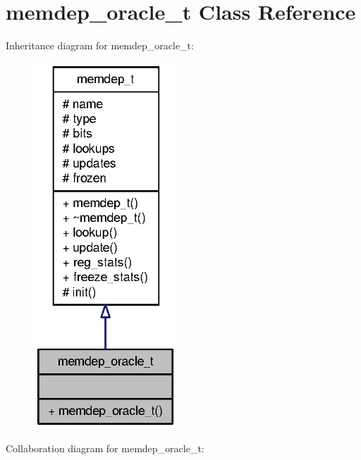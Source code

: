 \section{memdep\_\-oracle\_\-t Class Reference}
\label{classmemdep__oracle__t}
Inheritance diagram for memdep\_\-oracle\_\-t:\nopagebreak
\begin{figure}[H]
\begin{center}
\leavevmode
\includegraphics[width=152pt]{classmemdep__oracle__t__inherit__graph}
\end{center}
\end{figure}
Collaboration diagram for memdep\_\-oracle\_\-t:\nopagebreak
